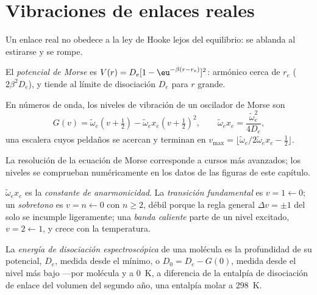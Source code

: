 \section{Vibraciones de enlaces reales}\label{sec:b3:rovibrational-spectroscopy:real-bonds}

Un enlace real no obedece a la ley de Hooke lejos del equilibrio: se ablanda al
estirarse y se rompe.

\begin{definition}\label{def:b3:rovibrational-spectroscopy:morse}
El \emph{potencial de Morse} es $V(r) = D_e[1 -
\eu^{-\beta(r - r_e)}]^2$: armónico cerca de $r_e$ ( $2\beta^2D_e$), y
tiende al límite de disociación $D_e$ para $r$ grande.
\end{definition}

\begin{proposition}\label{prop:b3:rovibrational-spectroscopy:morse-levels}
En números de onda, los niveles de vibración de un oscilador de Morse son
\[
G(v) = \tilde\omega_e(v + \tfrac12) - \tilde\omega_ex_e(v + \tfrac12)^2, \qquad
\tilde\omega_ex_e = \frac{\tilde\omega_e^2}{4D_e},
\]
una escalera cuyos peldaños se acercan y terminan en $v_{\max} = \lfloor\tilde\omega_e/
2\tilde\omega_ex_e - \frac12\rfloor$.
\end{proposition}
\admitted

La resolución de la ecuación de Morse corresponde a cursos más avanzados;
los niveles se comprueban numéricamente en los datos de las figuras de este capítulo.

\begin{definition}\label{def:b3:rovibrational-spectroscopy:anharmonic}
$\tilde\omega_ex_e$ es la \emph{constante de anarmonicidad}.
La \emph{transición fundamental}
es $v = 1 \leftarrow 0$; un \emph{sobretono} es $v = n \leftarrow 0$
con $n \ge 2$, débil porque la regla general $\Delta v = \pm1$ del  solo se incumple ligeramente; una \emph{banda caliente} parte
de un nivel excitado, $v = 2 \leftarrow 1$, y crece con la temperatura.
\end{definition}

\begin{definition}\label{def:b3:rovibrational-spectroscopy:dissociation}
La \emph{energía de disociación espectroscópica}
de una molécula es la profundidad de su potencial, $D_e$, medida desde el
mínimo, o $D_0 = D_e - G(0)$, medida desde el nivel más bajo ---por
molécula y a \qty{0}{K}, a diferencia de la entalpía de disociación de enlace del volumen del segundo
año, una entalpía molar a \qty{298}{K}.
\end{definition}

